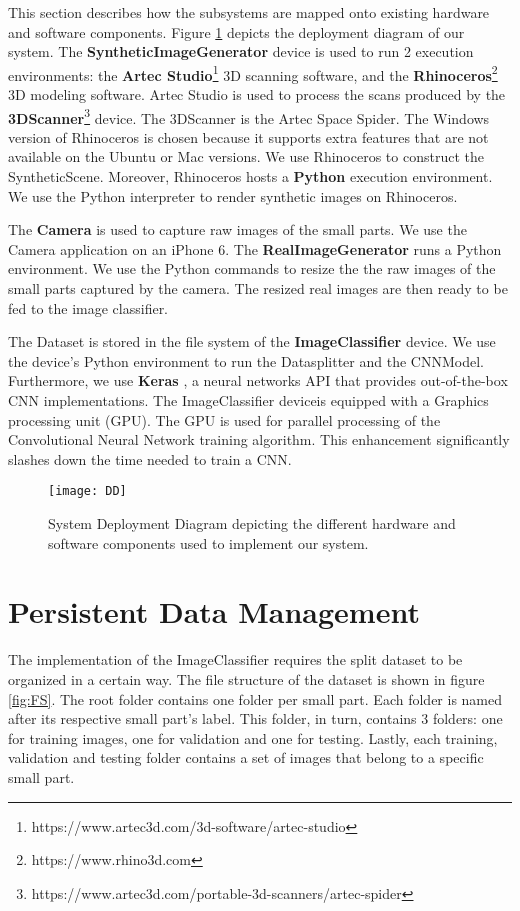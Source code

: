 This section describes how the subsystems are mapped onto existing hardware and software components. Figure \ref{fig:DD} depicts the deployment diagram of our system. The \textbf{SyntheticImageGenerator} device is used to run 2 execution environments: the \textbf{Artec Studio}\footnote{https://www.artec3d.com/3d-software/artec-studio} 3D scanning software, and the \textbf{Rhinoceros}\footnote{https://www.rhino3d.com} 3D modeling software. Artec Studio is used to process the scans produced by the \textbf{3DScanner}\footnote{https://www.artec3d.com/portable-3d-scanners/artec-spider} device. The 3DScanner is the Artec Space Spider. The Windows version of Rhinoceros is chosen because it supports extra features that are not available on the Ubuntu or Mac versions. We use Rhinoceros to construct the SyntheticScene. Moreover, Rhinoceros hosts a \textbf{Python} execution environment. We use the Python interpreter to render synthetic images on Rhinoceros.

The \textbf{Camera} is used to capture raw images of the small parts. We use the Camera application on an iPhone 6. The \textbf{RealImageGenerator} runs a Python environment. We use the Python commands to resize the the raw images of the small parts captured by the camera. The resized real images are then ready to be fed to the image classifier.

The Dataset is stored in the file system of the \textbf{ImageClassifier} device. We use the device's Python environment to run the Datasplitter and the CNNModel. Furthermore, we use \textbf{Keras} \cite{chollet2015keras}, a neural networks API that provides out-of-the-box CNN implementations. The ImageClassifier deviceis equipped with a Graphics processing unit (GPU). The GPU is used for parallel processing of the Convolutional Neural Network training algorithm. This enhancement significantly slashes down the time needed to train a CNN.

\begin{figure}[h]
\centering
  \texttt{[image: DD]}
\caption{System Deployment Diagram depicting the different hardware and software components used to implement our system.}
\label{fig:DD}
\end{figure}

\section{Persistent Data Management}\label{sec:persistent_data_management}

The implementation of the ImageClassifier requires the split dataset to be organized in a certain way. The file structure of the dataset is shown in figure \ref{fig:FS}. The root folder contains one folder per small part. Each folder is named after its respective small part's label. This folder, in turn, contains 3 folders: one for training images, one for validation and one for testing. Lastly, each training, validation and testing folder contains a set of images that belong to a specific small part.

